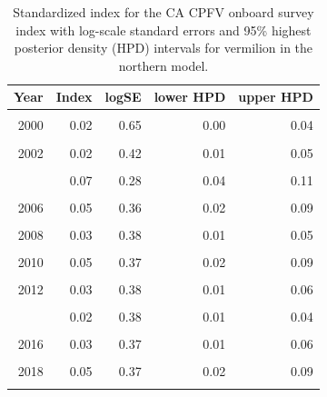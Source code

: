 \documentclass[11pt,
  english,
]{article}
\begin{document}
\begin{table}

\caption{\label{tab:tab-index-cpfvonboard}Standardized index for the CA CPFV onboard survey index with log-scale standard errors and 95\% highest
       posterior density (HPD) intervals for vermilion in the northern model.}
\centering
\begin{tabular}[t]{rrrrr}
\toprule
Year & Index & logSE & lower HPD & upper HPD\\
\midrule
\cellcolor{gray!6}{1999} & \cellcolor{gray!6}{0.02} & \cellcolor{gray!6}{0.53} & \cellcolor{gray!6}{0.01} & \cellcolor{gray!6}{0.05}\\
2000 & 0.02 & 0.65 & 0.00 & 0.04\\
\cellcolor{gray!6}{2001} & \cellcolor{gray!6}{0.01} & \cellcolor{gray!6}{0.53} & \cellcolor{gray!6}{0.00} & \cellcolor{gray!6}{0.02}\\
2002 & 0.02 & 0.42 & 0.01 & 0.05\\
\cellcolor{gray!6}{2003} & \cellcolor{gray!6}{0.05} & \cellcolor{gray!6}{0.33} & \cellcolor{gray!6}{0.02} & \cellcolor{gray!6}{0.09}\\
\addlinespace
2004 & 0.07 & 0.28 & 0.04 & 0.11\\
\cellcolor{gray!6}{2005} & \cellcolor{gray!6}{0.04} & \cellcolor{gray!6}{0.38} & \cellcolor{gray!6}{0.02} & \cellcolor{gray!6}{0.08}\\
2006 & 0.05 & 0.36 & 0.02 & 0.09\\
\cellcolor{gray!6}{2007} & \cellcolor{gray!6}{0.06} & \cellcolor{gray!6}{0.35} & \cellcolor{gray!6}{0.03} & \cellcolor{gray!6}{0.11}\\
2008 & 0.03 & 0.38 & 0.01 & 0.05\\
\addlinespace
\cellcolor{gray!6}{2009} & \cellcolor{gray!6}{0.04} & \cellcolor{gray!6}{0.37} & \cellcolor{gray!6}{0.02} & \cellcolor{gray!6}{0.07}\\
2010 & 0.05 & 0.37 & 0.02 & 0.09\\
\cellcolor{gray!6}{2011} & \cellcolor{gray!6}{0.04} & \cellcolor{gray!6}{0.37} & \cellcolor{gray!6}{0.02} & \cellcolor{gray!6}{0.08}\\
2012 & 0.03 & 0.38 & 0.01 & 0.06\\
\cellcolor{gray!6}{2013} & \cellcolor{gray!6}{0.02} & \cellcolor{gray!6}{0.42} & \cellcolor{gray!6}{0.01} & \cellcolor{gray!6}{0.04}\\
\addlinespace
2014 & 0.02 & 0.38 & 0.01 & 0.04\\
\cellcolor{gray!6}{2015} & \cellcolor{gray!6}{0.04} & \cellcolor{gray!6}{0.37} & \cellcolor{gray!6}{0.02} & \cellcolor{gray!6}{0.07}\\
2016 & 0.03 & 0.37 & 0.01 & 0.06\\
\cellcolor{gray!6}{2017} & \cellcolor{gray!6}{0.04} & \cellcolor{gray!6}{0.36} & \cellcolor{gray!6}{0.02} & \cellcolor{gray!6}{0.08}\\
2018 & 0.05 & 0.37 & 0.02 & 0.09\\
\addlinespace
\cellcolor{gray!6}{2019} & \cellcolor{gray!6}{0.04} & \cellcolor{gray!6}{0.37} & \cellcolor{gray!6}{0.02} & \cellcolor{gray!6}{0.08}\\
\bottomrule
\end{tabular}
\end{table}
\end{document}
